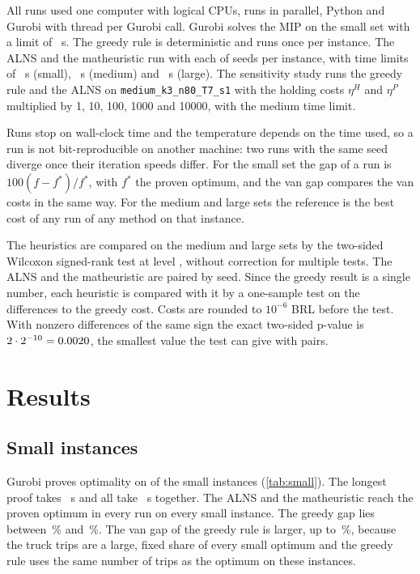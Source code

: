 \documentclass[11pt,a4paper]{article}
\begin{document}
All runs used one computer with \nCpus{} logical CPUs, \nWorkers{} runs in parallel, Python
\pythonVersion{} and Gurobi \gurobiVersion{} with \nThreads{} thread per Gurobi call. Gurobi solves
the MIP on the small set with a limit of \limitGurobi{}~s. The greedy rule is deterministic and runs
once per instance. The ALNS and the matheuristic run with each of \nSeeds{} seeds per instance, with
time limits of \limitSmall{}~s (small), \limitMedium{}~s (medium) and \limitLarge{}~s (large). The
sensitivity study runs the greedy rule and the ALNS on \texttt{medium\_k3\_n80\_T7\_s1} with the
holding costs $\eta^H$ and $\eta^P$ multiplied by 1, 10, 100, 1000 and 10000, with the medium time
limit. 

Runs stop on wall-clock time and the temperature depends on the time used, so a run is not
bit-reproducible on another machine: two runs with the same seed diverge once their iteration
speeds differ. For the small set the gap of a run is $100(f - f^*)/f^*$, with $f^*$ the proven
optimum, and the van gap compares the van costs in the same way. For the medium and large sets the
reference is the best cost of any run of any method on that instance.

The heuristics are compared on the medium and large sets by the two-sided Wilcoxon signed-rank test
\citep{wilcoxon1945individual} at level \alphaLevel{}, without correction for multiple tests. The
ALNS and the matheuristic are paired by seed. Since the greedy result is a single number, each
heuristic is compared with it by a one-sample test on the \nSeeds{} differences to the greedy
cost. Costs are rounded to $10^{-6}$ BRL before the test. With \nSeeds{} nonzero differences of
the same sign the exact two-sided p-value is $2 \cdot 2^{-10} = 0.0020$, the smallest
value the test can give with \nSeeds{} pairs.

\section{Results}\label{sec:results}

\subsection{Small instances}
Gurobi proves optimality on \nGurobiOptimal{} of the \nSmall{} small instances
(\cref{tab:small}). The longest proof
takes \gurobiMaxTime{}~s and all \nSmall{} take \gurobiTotalTime{}~s together. The ALNS and the
matheuristic reach the proven optimum in every run on every small instance. The greedy gap lies
between \greedyMinGap{}\,\% and \greedyMaxGap{}\,\%. The van gap of the greedy rule is larger, up
to \greedyMaxVanGap{}\,\%, because the truck trips are a large, fixed share of every small optimum
and the greedy rule uses the same number of trips as the optimum on these instances.
\end{document}
